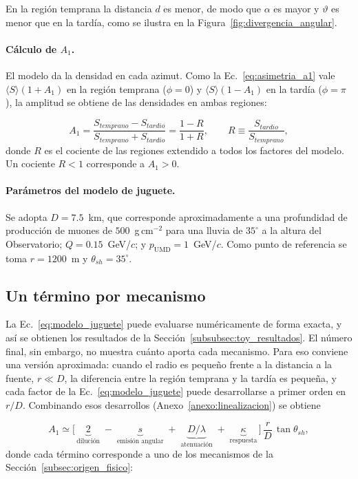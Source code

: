 En la región temprana la distancia $d$ es menor, de modo que $\alpha$ es mayor y $\vartheta$ es menor que en la tardía, como se ilustra en la Figura~\ref{fig:divergencia_angular}.

\paragraph{Cálculo de $A_1$.} El modelo da la densidad en cada azimut. Como la Ec.~\ref{eq:asimetria_a1} vale $\langle S\rangle(1+A_1)$ en la región temprana ($\phi=0$) y $\langle S\rangle(1-A_1)$ en la tardía ($\phi=\pi$), la amplitud se obtiene de las densidades en ambas regiones:

\begin{equation}
	A_1 = \frac{S_{temprano}-S_{tardio}}{S_{temprano}+S_{tardio}} = \frac{1-R}{1+R},
	\qquad R \equiv \frac{S_{tardio}}{S_{temprano}},
	\label{eq:a1_cociente}
\end{equation}
%
donde $R$ es el cociente de las regiones extendido a todos los factores del modelo. Un cociente $R<1$ corresponde a $A_1>0$.

\paragraph{Parámetros del modelo de juguete.} Se adopta $D=7.5$~km, que corresponde aproximadamente a una profundidad de producción de muones de $500$~g\,cm$^{-2}$ para una lluvia de $35^\circ$ a la altura del Observatorio; $Q=0.15$~GeV/$c$; y $p_{\mathrm{UMD}}=1$~GeV/$c$. Como punto de referencia se toma $r=1200$~m y $\theta_{sh}=35^\circ$. 

\subsection{Un término por mecanismo}
\label{subsubsec:linealizacion}

La Ec.~\ref{eq:modelo_juguete} puede evaluarse numéricamente de forma exacta, y así se obtienen los resultados de la Sección~\ref{subsubsec:toy_resultados}. El número final, sin embargo, no muestra cuánto aporta cada mecanismo. Para eso conviene una versión aproximada: cuando el radio es pequeño frente a la distancia a la fuente, $r\ll D$, la diferencia entre la región temprana y la tardía es pequeña, y cada factor de la Ec.~\ref{eq:modelo_juguete} puede desarrollarse a primer orden en $r/D$. Combinando esos desarrollos (Anexo~\ref{anexo:linealizacion}) se obtiene

\begin{equation}
	A_1 \simeq \Big[\,\underbrace{2}_{\text{dilución}} \;-\; \underbrace{s}_{\text{emisión angular}} \;+\; \underbrace{D/\lambda}_{\text{atenuación}} \;+\; \underbrace{\kappa}_{\text{respuesta}}\,\Big]\,\frac{r}{D}\,\tan\theta_{sh} ,
	\label{eq:a1_lineal}
\end{equation}
%
donde cada término corresponde a uno de los mecanismos de la Sección~\ref{subsec:origen_fisico}:

